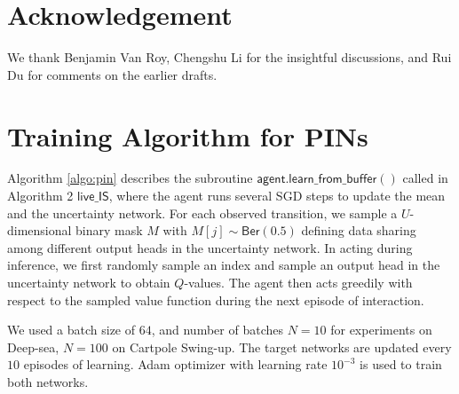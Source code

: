 \documentclass[letterpaper]{article} %
\theoremstyle{definition}
\begin{document}
\section{Acknowledgement}
We thank Benjamin Van Roy, Chengshu Li for the insightful discussions, and Rui Du for comments on the earlier drafts.

\medskip




\newpage
\appendix 
\onecolumn

\section{Training Algorithm for PINs}

Algorithm \ref{algo:pin} describes the subroutine $\mathsf{agent.learn\_from\_buffer()}$ called in Algorithm 2 $\mathsf{live\_IS}$, where the agent runs several SGD steps to update the mean and the uncertainty network. For each observed transition, we sample a $U$-dimensional binary mask $M$ with $M[j] \sim \mathsf{Ber}(0.5)$ defining data sharing among different output heads in the uncertainty network. In acting during inference, we first randomly sample an index and sample an output head in the uncertainty network to obtain $Q$-values. The agent then acts greedily with respect to the sampled value function during the next episode of interaction.                    

We used a batch size of $64$, and number of batches $N = 10$ for experiments on Deep-sea, $N = 100$ on Cartpole Swing-up. The target networks are updated every $10$ episodes of learning. Adam optimizer with learning rate $10^{-3}$ is used to train both networks. 
\end{document}
